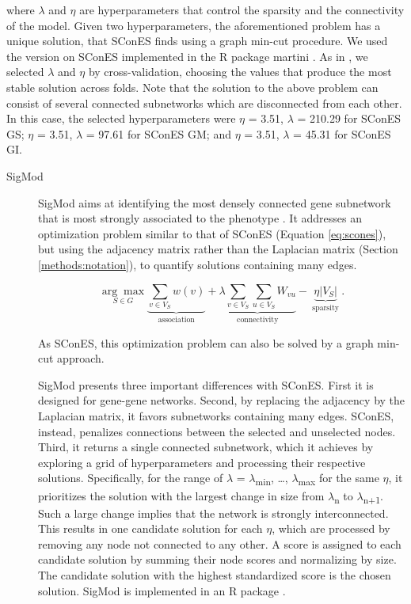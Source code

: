 \documentclass[twocolumn, 10pt]{article}
\begin{document}
\begin{description}
where \(\lambda\) and \(\eta\) are hyperparameters that control the sparsity and the connectivity of the model. Given two hyperparameters, the aforementioned problem has a unique solution, that SConES finds using a graph min-cut procedure. We used the version on SConES implemented in the R package martini \cite{martini}. As in \citet{azencott_efficient_2013}, we selected \(\lambda\) and \(\eta\) by cross-validation, choosing the values that produce the most stable solution across folds. Note that the solution to the above problem can consist of several connected subnetworks which are disconnected from each other. In this case, the selected hyperparameters were \(\eta\) = 3.51, \(\lambda\) = 210.29 for SConES GS; \(\eta\) = 3.51, \(\lambda\) = 97.61 for SConES GM; and \(\eta\) = 3.51, \(\lambda\) = 45.31 for SConES GI.
\end{description}

\begin{description}
\item[{SigMod}] SigMod aims at identifying the most densely connected gene subnetwork that is most strongly associated to the phenotype \cite{liu_sigmod:_2017}. It addresses an optimization problem similar to that of SConES (Equation \ref{eq:scones}), but using the adjacency matrix rather than the Laplacian matrix (Section \ref{methods:notation}), to quantify solutions containing many edges.  

\begin{equation*}
\underset{S \in G}{\arg \max } \underbrace{\sum_{v \in V_S} w(v)}_{\text { association }} + \underbrace{\lambda \sum_{v \in V_S} \sum_{u \in V_S} W_{vu} }_{\text { connectivity }} -\underbrace{\eta \lvert V_S \rvert }_{\text { sparsity }}.
\end{equation*}

As SConES, this optimization problem can also be solved by a graph min-cut approach. 

SigMod presents three important differences with SConES. First it is designed for gene-gene networks. Second, by replacing the adjacency by the Laplacian matrix, it favors subnetworks containing many edges. SConES, instead, penalizes connections between the selected and unselected nodes. Third, it returns a single connected subnetwork, which it achieves by exploring a grid of hyperparameters and processing their respective solutions. Specifically, for the range of \(\lambda\) = \(\lambda\)\textsubscript{min}, \dots{}, \(\lambda\)\textsubscript{max} for the same \(\eta\), it prioritizes the solution with the largest change in size from \(\lambda\)\textsubscript{n} to \(\lambda\)\textsubscript{n+1}. Such a large change implies that the network is strongly interconnected. This results in one candidate solution for each \(\eta\), which are processed by removing any node not connected to any other. A score is assigned to each candidate solution by summing their node scores and normalizing by size. The candidate solution with the highest standardized score is the chosen solution. SigMod is implemented in an R package \cite{sigmod}.
\end{description}
\end{document}
